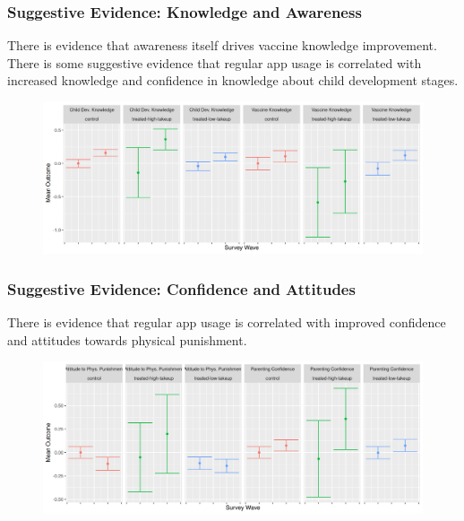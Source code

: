 \documentclass[aspectratio=169]{beamer}
\begin{document}
\begin{frame}
 \frametitle{Suggestive Evidence: Knowledge and Awareness}
There is evidence that awareness itself drives vaccine knowledge improvement. There is some suggestive evidence that regular app usage is correlated with increased knowledge and confidence in knowledge about child development stages. 
\begin{figure}[H]
  \centering
\includegraphics[width=\textwidth]{../plots/pre_post/Pooled: Vaccine Knowledge.png}
\label{fig:knowledge-pre-post}
\end{figure}
   
\end{frame}

\begin{frame}
 \frametitle{Suggestive Evidence: Confidence and Attitudes}

There is evidence that regular app usage is correlated with improved confidence and attitudes towards physical punishment. 
\begin{figure}[H]
  \centering
\includegraphics[width=\textwidth]{../plots/pre_post/Pooled: Parenting Confidence.png}
\label{fig:confidence-and-attitudes-pre-post}
\end{figure}
   
\end{frame}
\end{document}
